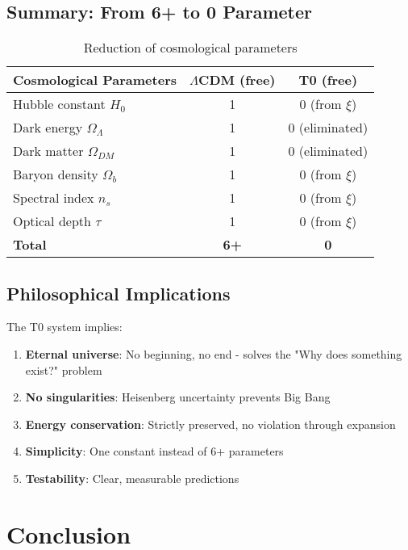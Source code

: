 \documentclass[12pt,a4paper]{article}
\begin{document}
\subsection{Summary: From 6+ to 0 Parameter}
\label{subsec:cosmic_summary}

\begin{table}[h]
	\centering
	\begin{tabular}{lcc}
		\toprule
		\textbf{Cosmological Parameters} & \textbf{$\Lambda$CDM (free)} & \textbf{T0 (free)} \\
		\midrule
		Hubble constant $H_0$ & 1 & 0 (from $\xi$) \\
		Dark energy $\Omega_{\Lambda}$ & 1 & 0 (eliminated) \\
		Dark matter $\Omega_{DM}$ & 1 & 0 (eliminated) \\
		Baryon density $\Omega_b$ & 1 & 0 (from $\xi$) \\
		Spectral index $n_s$ & 1 & 0 (from $\xi$) \\
		Optical depth $\tau$ & 1 & 0 (from $\xi$) \\
		\midrule
		\textbf{Total} & \textbf{6+} & \textbf{0} \\
		\bottomrule
	\end{tabular}
	\caption{Reduction of cosmological parameters}
\end{table}


\subsection{Philosophical Implications}
\label{subsec:philosophical_implications}

The T0 system implies:
\begin{enumerate}
	\item \textbf{Eternal universe}: No beginning, no end - solves the "Why does something exist?" problem
	\item \textbf{No singularities}: Heisenberg uncertainty prevents Big Bang
	\item \textbf{Energy conservation}: Strictly preserved, no violation through expansion
	\item \textbf{Simplicity}: One constant instead of 6+ parameters
	\item \textbf{Testability}: Clear, measurable predictions
\end{enumerate}
	\section{Conclusion}
	
\end{document}
